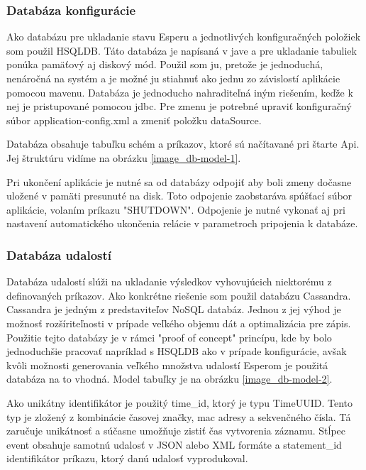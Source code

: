 		\subsubsection{Databáza konfigurácie}
		Ako databázu pre ukladanie stavu Esperu a jednotlivých konfiguračných položiek som použil \ac{HSQLDB}. Táto databáza je napísaná v jave a pre ukladanie tabuliek ponúka pamäťový aj diskový mód. Použil som ju, pretože je jednoduchá, nenáročná na systém a je možné ju stiahnuť ako jednu zo závislostí aplikácie pomocou mavenu. Databáza je jednoducho nahraditeľná iným riešením, keďže k nej je pristupované pomocou jdbc. Pre zmenu je potrebné upraviť konfiguračný súbor application-config.xml a zmeniť položku dataSource.
		
		Databáza obsahuje tabuľku schém a príkazov, ktoré sú načítavané pri štarte Api. Jej štruktúru vidíme na obrázku \ref{image_db-model-1}.
		
		Pri ukončení aplikácie je nutné sa od databázy odpojiť aby boli zmeny dočasne uložené v pamäti presunuté na disk. Toto odpojenie zaobstaráva spúšťací súbor aplikácie, volaním príkazu "SHUTDOWN". Odpojenie je nutné vykonať aj pri nastavení automatického ukončenia relácie v parametroch pripojenia k databáze.
		
		\subsubsection{Databáza udalostí}
		Databáza udalostí slúži na ukladanie výsledkov vyhovujúcich niektorému z definovaných príkazov. Ako konkrétne riešenie som použil databázu Cassandra. Cassandra je jedným z predstaviteľov NoSQL databáz. Jednou z jej výhod je možnosť rozšíriteľnosti v prípade veľkého objemu dát a optimalizácia pre zápis. Použitie tejto databázy je v rámci "proof of concept" princípu, kde by bolo jednoduchšie pracovať napríklad s HSQLDB ako v prípade konfigurácie, avšak kvôli možnosti generovania veľkého množstva udalostí Esperom je použitá databáza na to vhodná. Model tabuľky je na obrázku \ref{image_db-model-2}.

		Ako unikátny identifikátor je použitý time\_id, ktorý je typu TimeUUID. Tento typ je zložený z kombinácie časovej značky, mac adresy a sekvenčného čísla. Tá zaručuje unikátnosť a súčasne umožňuje zistiť čas vytvorenia záznamu. Stĺpec event obsahuje samotnú udalosť v JSON alebo XML formáte a statement\_id identifikátor príkazu, ktorý danú udalosť vyprodukoval.
	
